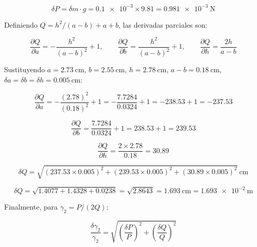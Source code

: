 \begin{appendices}
\begin{equation*}
    \delta P = \delta m \cdot g
    = \num{0.1e-3} \times \num{9.81}
    = \qty{0.981e-3}{\newton}
\end{equation*}

Definiendo $Q = h^2/(a-b) + a + b$, las derivadas parciales son:

\begin{equation}
    \frac{\partial Q}{\partial a} = -\frac{h^2}{(a-b)^2} + 1, \qquad
    \frac{\partial Q}{\partial b} =  \frac{h^2}{(a-b)^2} + 1, \qquad
    \frac{\partial Q}{\partial h} = \frac{2h}{a-b}
\end{equation}

Sustituyendo $a = \qty{2.73}{\centi\meter}$,
$b = \qty{2.55}{\centi\meter}$,
$h = \qty{2.78}{\centi\meter}$,
$a - b = \qty{0.18}{\centi\meter}$,
$\delta a = \delta b = \delta h = \qty{0.005}{\centi\meter}$:

\begin{equation*}
    \frac{\partial Q}{\partial a}
    = -\frac{(\num{2.78})^2}{(\num{0.18})^2} + 1
    = -\frac{\num{7.7284}}{\num{0.0324}} + 1
    = -\num{238.53} + 1
    = -\num{237.53}
\end{equation*}

\begin{equation*}
    \frac{\partial Q}{\partial b}
    = \frac{\num{7.7284}}{\num{0.0324}} + 1
    = \num{238.53} + 1
    = \num{239.53}
\end{equation*}

\begin{equation*}
    \frac{\partial Q}{\partial h}
    = \frac{2 \times \num{2.78}}{\num{0.18}}
    = \num{30.89}
\end{equation*}

\begin{equation*}
    \delta Q = \sqrt{
        (\num{237.53} \times \num{0.005})^2 +
        (\num{239.53} \times \num{0.005})^2 +
        (\num{30.89}  \times \num{0.005})^2
    }\ \si{\centi\meter}
\end{equation*}

\begin{equation*}
    \delta Q = \sqrt{\num{1.4077} + \num{1.4328} + \num{0.0238}}
             = \sqrt{\num{2.8643}}
             = \qty{1.693}{\centi\meter}
             = \qty{1.693e-2}{\meter}
\end{equation*}

Finalmente, para $\gamma_2 = P/(2Q)$:

\begin{equation}
    \frac{\delta\gamma_2}{\gamma_2}
    = \sqrt{
        \left(\frac{\delta P}{P}\right)^2 +
        \left(\frac{\delta Q}{Q}\right)^2
      }
\end{equation}


\end{appendices}
